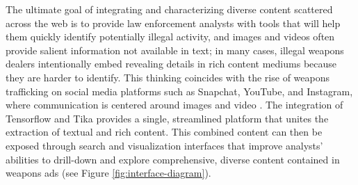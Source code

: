 
\label{sec:memex-tools}
The ultimate goal of integrating and characterizing diverse content scattered across the web is to provide law enforcement analysts with tools that will help them quickly identify potentially illegal activity, and images and videos often provide salient information not available in text; in many cases, illegal weapons dealers intentionally embed revealing details in rich content mediums because they are harder to identify. This thinking coincides with the rise of weapons trafficking on social media platforms such as Snapchat, YouTube, and Instagram, where communication is centered around images and video \cite{socialmedia}. The integration of Tensorflow and Tika provides a single, streamlined platform that unites the extraction of textual and rich content. This combined content can then be exposed through search and visualization interfaces that improve analysts' abilities to drill-down and explore comprehensive, diverse content contained in weapons ads (see Figure \ref{fig:interface-diagram}). 